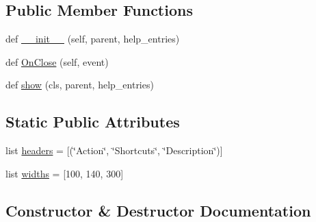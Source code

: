 \subsection*{Public Member Functions}
\begin{DoxyCompactItemize}
\item 
def \hyperlink{classmatplotlib_1_1backends_1_1backend__wx_1_1__HelpDialog_a18938314719ef374c9850eb6a5ee7239}{\+\_\+\+\_\+init\+\_\+\+\_\+} (self, parent, help\+\_\+entries)
\item 
def \hyperlink{classmatplotlib_1_1backends_1_1backend__wx_1_1__HelpDialog_a6f2109e6095255b7d647ac69327185b0}{On\+Close} (self, event)
\item 
def \hyperlink{classmatplotlib_1_1backends_1_1backend__wx_1_1__HelpDialog_a40fd761848233f2ecd38d7b43bcae080}{show} (cls, parent, help\+\_\+entries)
\end{DoxyCompactItemize}
\subsection*{Static Public Attributes}
\begin{DoxyCompactItemize}
\item 
list \hyperlink{classmatplotlib_1_1backends_1_1backend__wx_1_1__HelpDialog_aa6eba5282da1a01258969f7067008c1c}{headers} = \mbox{[}(\char`\"{}Action\char`\"{}, \char`\"{}Shortcuts\char`\"{}, \char`\"{}Description\char`\"{})\mbox{]}
\item 
list \hyperlink{classmatplotlib_1_1backends_1_1backend__wx_1_1__HelpDialog_ac1d77443cdd7cd0a3ed70f677ed1ee0d}{widths} = \mbox{[}100, 140, 300\mbox{]}
\end{DoxyCompactItemize}


\subsection{Constructor \& Destructor Documentation}
\mbox{\label{classmatplotlib_1_1backends_1_1backend__wx_1_1__HelpDialog_a18938314719ef374c9850eb6a5ee7239}} 
